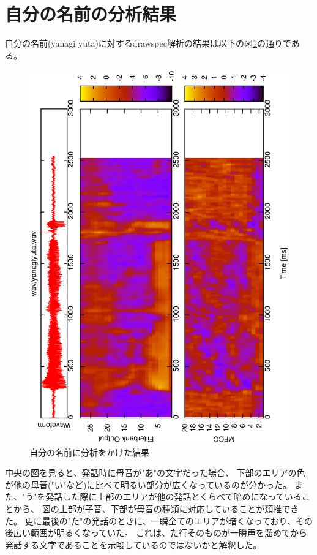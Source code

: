 \documentclass[11pt,a4paper, uplatex]{jsarticle}
\begin{document}
\section{自分の名前の分析結果}
自分の名前(yanagi yuta)に対するdrawspec解析の結果は以下の図\ref{fig:nameps}の通りである。

\begin{figure}[h]
  \begin{center}
    \includegraphics[width=13.0cm]{yanagiyuta.ps}
    \caption{自分の名前に分析をかけた結果}
    \label{fig:nameps}
  \end{center}
\end{figure}

中央の図を見ると、発話時に母音が"あ"の文字だった場合、
下部のエリアの色が他の母音("い"など)に比べて明るい部分が広くなっているのが分かった。
また、"う"を発話した際に上部のエリアが他の発話とくらべて暗めになっていることから、
図の上部が子音、下部が母音の種類に対応していることが類推できた。
更に最後の"た"の発話のときに、一瞬全てのエリアが暗くなっており、その後広い範囲が明るくなっていた。
これは、た行そのものが一瞬声を溜めてから発話する文字であることを示唆しているのではないかと解釈した。
\end{document}
